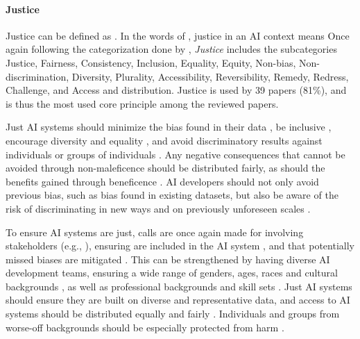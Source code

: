\paragraph{Justice}
Justice can be defined as  \parencite{dictionary_justice}. In the words of \textcite[p.~7]{Floridi_2019}, justice in an AI context means  Once again following the categorization done by \textcite{Ryan_2021}, \textit{Justice} includes the subcategories Justice, Fairness, Consistency, Inclusion, Equality, Equity, Non-bias, Non-discrimination, Diversity, Plurality, Accessibility, Reversibility, Remedy, Redress, Challenge, and Access and distribution. Justice is used by 39 papers (81\%), and is thus the most used core principle among the reviewed papers.

Just AI systems should minimize the bias found in their data \parencite{Rothenberger_2019,Nauck_2019,Jobin_2019,Fjeld_2020,Clarke_2019}, be inclusive \parencite{Mikalef_2022,Lu_2022}, encourage diversity \parencite{Mikalef_2022} and equality \parencite{Gupta_2021,Fjeld_2020,Canca_2020}, and avoid discriminatory results against individuals or groups of individuals \parencite{Mikalef_2022,Werder_2022,Lu_2022,Jobin_2019,Hacker_2022}. Any negative consequences that cannot be avoided through non-maleficence should be distributed fairly, as should the benefits gained through beneficence \parencite{Jobin_2019,Doorn_2021}. AI developers should not only avoid previous bias, such as bias found in existing datasets, but also be aware of the risk of discriminating in new ways and on previously unforeseen scales \parencite[p.~48]{Fjeld_2020}.

To ensure AI systems are just, calls are once again made for involving stakeholders (e.g., \cite{Lu_2022,Fjeld_2020}), ensuring  are included in the AI system \parencite[p.~10]{Lukkien_2021}, and that potentially missed biases are mitigated \parencite{Siala_2022}. This can be strengthened by having diverse AI development teams, ensuring a wide range of genders, ages, races and cultural backgrounds \parencite[p.~104]{Lu_2022}, as well as professional backgrounds and skill sets \parencite[p.~52]{Fjeld_2020}. Just AI systems should ensure they are built on diverse \parencite{Doorn_2021} and representative \parencite{Hacker_2022,Fjeld_2020} data, and access to AI systems should be distributed equally and fairly \parencite{Jobin_2019,Fjeld_2020,Canca_2020}. Individuals and groups from worse-off backgrounds should be especially protected from harm \parencite{Canca_2020}.

